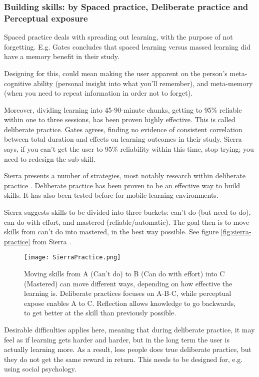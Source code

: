   \subsubsection{Building skills: by Spaced practice, Deliberate practice and Perceptual exposure}

  Spaced practice deals with spreading out learning, with the purpose of not forgetting. E.g. Gates \cite{Gates} concludes that spaced learning versus massed learning did have a memory benefit in their study.

  Designing for this, could mean making the user apparent on the person's meta-cognitive ability (personal insight into what you'll remember), and meta-memory (when you need to repeat information in order not to forget).

  Moreover, dividing learning into 45-90-minute chunks, getting to 95\% reliable within one to three sessions, has been proven highly effective. This is called deliberate practice. Gates \cite{Gates} agrees, finding no evidence of consistent correlation between total duration and effects on learning outcomes in their study. Sierra says, if you can’t get the user to 95\% reliability within this time, stop trying; you need to redesign the sub-skill. \cite{sierra}

  Sierra presents a number of strategies, most notably research within deliberate practice \cite{yengin} \cite{sierra}. Deliberate practice has been proven to be an effective way to build skills. It has also been tested before for mobile learning environments. \cite{yengin}

  Sierra \cite{sierra} suggests skills to be divided into three buckets: can't do (but need to do), can do with effort, and mastered (reliable/automatic). The goal then is to move skills from can't do into mastered, in the best way possible. See figure \ref{fig:sierra-practice} from Sierra \cite{sierra}.

  \begin{figure}[h]
    \centering
    \texttt{[image: SierraPractice.png]}
    \caption{Moving skills from A (Can't do) to B (Can do with effort) into C (Mastered) can move different ways, depending on how effective the learning is. Deliberate practices focuses on A-B-C, while perceptual expose enables A to C. Reflection allows knowledge to go backwards, to get better at the skill than previously possible.}
    \label{fig:iterationprocess}
\end{figure}

  Desirable difficulties applies here, meaning that during deliberate practice, it may feel as if learning gets harder and harder, but in the long term the user is actually learning more. As a result, less people does true deliberate practice, but they do not get the same reward in return. This needs to be designed for, e.g. using social psychology.

